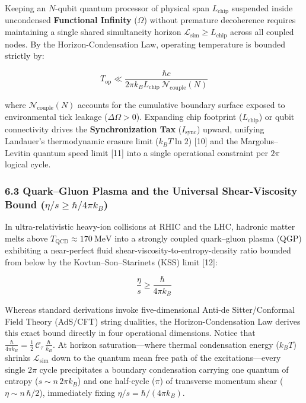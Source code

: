 \documentclass[
]{article}
\begin{document}
Keeping an \(N\)-qubit quantum processor of physical span
\(L_{\mathrm{chip}}\) suspended inside uncondensed \textbf{Functional
Infinity} (\(\Omega\)) without premature decoherence requires
maintaining a single shared simultaneity horizon
\(\mathcal{L}_{\mathrm{sim}} \ge L_{\mathrm{chip}}\) across all coupled
nodes. By the Horizon-Condensation Law, operating temperature is bounded
strictly by:

\[T_{\mathrm{op}} \ll \frac{\hbar c}{2\pi k_B L_{\mathrm{chip}}\,\mathcal{N}_{\mathrm{couple}}(N)}\]

where \(\mathcal{N}_{\mathrm{couple}}(N)\) accounts for the cumulative
boundary surface exposed to environmental tick leakage
(\(\Delta\Omega > 0\)). Expanding chip footprint (\(L_{\mathrm{chip}}\))
or qubit connectivity drives the \textbf{Synchronization Tax}
(\(I_{\mathrm{sync}}\)) upward, unifying Landauer's thermodynamic
erasure limit (\(k_B T \ln 2\)) {[}10{]} and the Margolus--Levitin
quantum speed limit {[}11{]} into a single operational constraint per
\(2\pi\) logical cycle.

\subsubsection{\texorpdfstring{6.3 Quark--Gluon Plasma and the Universal
Shear-Viscosity Bound
(\(\eta/s \ge \hbar / 4\pi k_B\))}{6.3 Quark--Gluon Plasma and the Universal Shear-Viscosity Bound (\textbackslash eta/s \textbackslash ge \textbackslash hbar / 4\textbackslash pi k\_B)}}\label{quarkgluon-plasma-and-the-universal-shear-viscosity-bound-etas-ge-hbar-4pi-k_b}

In ultra-relativistic heavy-ion collisions at RHIC and the LHC, hadronic
matter melts above \(T_{\mathrm{QCD}} \approx 170\ \text{MeV}\) into a
strongly coupled quark--gluon plasma (QGP) exhibiting a near-perfect
fluid shear-viscosity-to-entropy-density ratio bounded from below by the
Kovtun--Son--Starinets (KSS) limit {[}12{]}:

\[\frac{\eta}{s} \ge \frac{\hbar}{4\pi k_B}\]

Whereas standard derivations invoke five-dimensional Anti-de
Sitter/Conformal Field Theory (AdS/CFT) string dualities, the
Horizon-Condensation Law derives this exact bound directly in four
operational dimensions. Notice that
\(\frac{\hbar}{4\pi k_B} = \frac{1}{2}\,\mathcal{C}_\tau\,\frac{\hbar}{k_B}\).
At horizon saturation---where thermal condensation energy (\(k_B T\))
shrinks \(\mathcal{L}_{\mathrm{sim}}\) down to the quantum mean free
path of the excitations---every single \(2\pi\) cycle precipitates a
boundary condensation carrying one quantum of entropy
(\(s \sim n\,2\pi k_B\)) and one half-cycle (\(\pi\)) of transverse
momentum shear (\(\eta \sim n\,\hbar / 2\)), immediately fixing
\(\eta / s = \hbar / (4\pi k_B)\).
\end{document}
